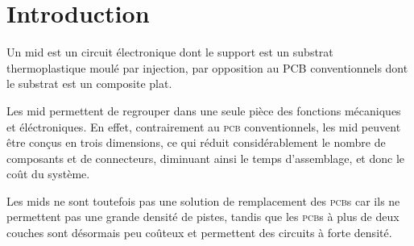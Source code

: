 \section{Introduction}
Un \gls{mid}  est un circuit électronique
dont le support est un substrat thermoplastique moulé par injection, par
opposition au \textsc{PCB} conventionnels dont le substrat est un composite
plat.

Les \gls{mid} permettent de regrouper dans une seule pièce des fonctions
mécaniques et éléctroniques. En effet, contrairement au \textsc{pcb} conventionnels, les
\gls{mid} peuvent être conçus en trois dimensions, ce qui réduit
considérablement le nombre de composants et de connecteurs, diminuant ainsi le
temps d'assemblage, et donc le coût du système. 

Les \gls{mid}s ne sont toutefois pas une solution de remplacement des
\textsc{pcb}s car ils ne permettent pas une grande densité de pistes, tandis que
les \textsc{pcb}s à plus de deux couches sont désormais peu coûteux et
permettent des circuits à forte densité.
